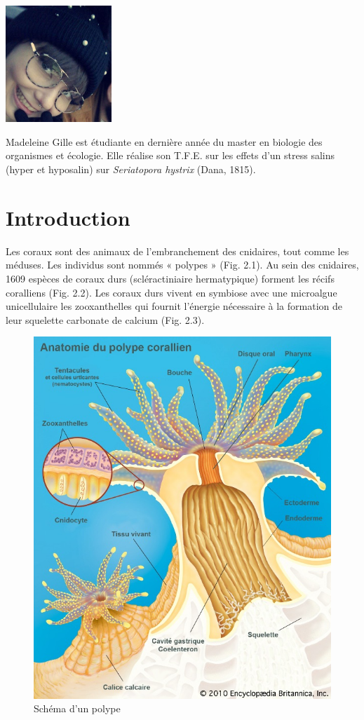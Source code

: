 \documentclass[]{report}
\begin{document}
\includegraphics[width=4.00000cm]{../image/madeleine.jpg}

Madeleine Gille est étudiante en dernière année du master en biologie
des organismes et écologie. Elle réalise son T.F.E. sur les effets d'un
stress salins (hyper et hyposalin) sur \emph{Seriatopora hystrix} (Dana,
1815).

\chapter{Introduction}\label{introduction}

Les coraux sont des animaux de l'embranchement des cnidaires, tout comme
les méduses. Les individus sont nommés « polypes » (Fig. 2.1). Au sein
des cnidaires, 1609 espèces de coraux durs (scléractiniaire
hermatypique) forment les récifs coralliens (Fig. 2.2). Les coraux durs
vivent en symbiose avec une microalgue unicellulaire les zooxanthelles
qui fournit l'énergie nécessaire à la formation de leur squelette
carbonate de calcium (Fig. 2.3).

\begin{figure}
\centering
\includegraphics{../image/polype_schema.jpg}
\caption{Schéma d'un polype}
\end{figure}
\end{document}
